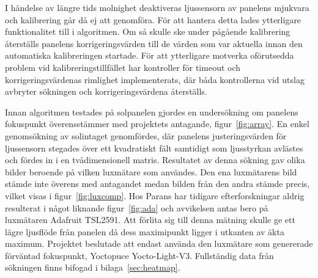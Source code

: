             I händelse av längre tids molnighet deaktiveras ljussensorn av panelens mjukvara och kalibrering går då ej att genomföra. För att hantera detta lades ytterligare funktionalitet till i algoritmen. Om så skulle ske under pågående kalibrering återställs panelens korrigeringsvärden till de värden som var aktuella innan den automatiska kalibreringen startade. För att ytterligare motverka oförutsedda problem vid kalibreringstillfället har kontroller för timeout och korrigeringsvärdenas rimlighet implementerats, där båda kontrollerna vid utslag avbryter sökningen och korrigeringsvärdena återställs.\bigskip

            Innan algoritmen testades på solpanelen gjordes en undersökning om panelens fokuspunkt överensstämmer med projektets antagande, figur~\ref{fig:array}. 
            En enkel genomsökning av solintaget genomfördes, där panelens justeringsvärden för ljussensorn stegades över ett kvadratiskt fält samtidigt som ljusstyrkan avlästes och fördes in i en tvådimensionell matris.
            Resultatet av denna sökning gav olika bilder beroende på vilken luxmätare som användes. Den ena luxmätarens bild stämde inte överens med antagandet medan bilden från den andra stämde precis, vilket visas i figur~\ref{fig:luxcomp}.
            Hos Parans har tidigare efterforskningar aldrig resulterat i något liknande figur~\ref{fig:ada} och avvikelsen antas bero på luxmätaren Adafruit TSL2591. Att förlita sig till denna mätning skulle ge ett lägre ljusflöde från panelen då dess maximipunkt ligger i utkanten av äkta maximum.
            Projektet beslutade att endast använda den luxmätare som genererade förväntad fokuspunkt, Yoctopuce Yocto-Light-V3.
            Fullständig data från sökningen finns bifogad i bilaga~\ref{sec:heatmap}.

